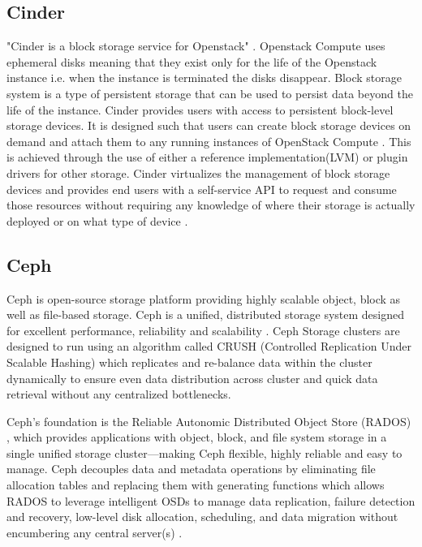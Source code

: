      
\subsection{Cinder}
      
     "Cinder is a block storage service for Openstack"
     \cite{wiki-Cinder}. Openstack Compute uses ephemeral disks
     meaning that they exist only for the life of the Openstack
     instance i.e. when the instance is terminated the disks
     disappear. Block storage system is a type of persistent storage
     that can be used to persist data beyond the life of the
     instance. Cinder provides users with access to persistent
     block-level storage devices. It is designed such that users can
     create block storage devices on demand and attach them to any
     running instances of OpenStack Compute \cite{book-Cinder}. This
     is achieved through the use of either a reference
     implementation(LVM) or plugin drivers for other storage. Cinder
     virtualizes the management of block storage devices and provides
     end users with a self-service API to request and consume those
     resources without requiring any knowledge of where their storage
     is actually deployed or on what type of device
     \cite{wiki-Cinder}.
     
\subsection{Ceph}

     Ceph is open-source storage platform providing highly scalable
     object, block as well as file-based storage. Ceph is a unified,
     distributed storage system designed for excellent performance,
     reliability and scalability \cite{www-ceph}. Ceph Storage
     clusters are designed to run using an algorithm called CRUSH
     (Controlled Replication Under Scalable Hashing) which replicates
     and re-balance data within the cluster dynamically to ensure even
     data distribution across cluster and quick data retrieval without
     any centralized bottlenecks.
 
     Ceph’s foundation is the Reliable Autonomic Distributed Object
     Store (RADOS) \cite{www-cepharch}, which provides applications
     with object, block, and file system storage in a single unified
     storage cluster—making Ceph flexible, highly reliable and easy to
     manage. Ceph decouples data and metadata operations by
     eliminating file allocation tables and replacing them with
     generating functions which allows RADOS to leverage intelligent
     OSDs to manage data replication, failure detection and recovery,
     low-level disk allocation, scheduling, and data migration without
     encumbering any central server(s) \cite{paper-Ceph}.
 
